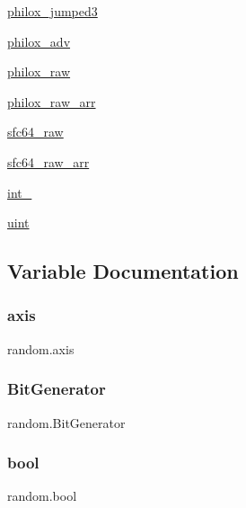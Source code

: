 \begin{DoxyCompactItemize}
\hyperlink{namespacerandom_af1d30e254acbd8179760d565255917eb}{philox\+\_\+jumped3}
\item 
\hyperlink{namespacerandom_a0c56ae1e99cee123038bb26a66bd5a71}{philox\+\_\+adv}
\item 
\hyperlink{namespacerandom_a51e37253ac2b1f47b665ef5a6ac891da}{philox\+\_\+raw}
\item 
\hyperlink{namespacerandom_abdf81d4acfa5d5a4075d9e05ead95583}{philox\+\_\+raw\+\_\+arr}
\item 
\hyperlink{namespacerandom_a3463561156ae5ea78b5dbcb729b95dc6}{sfc64\+\_\+raw}
\item 
\hyperlink{namespacerandom_a464491bb13d16f034a57ffc92edcc025}{sfc64\+\_\+raw\+\_\+arr}
\item 
\hyperlink{namespacerandom_ab5e98a5660edcb11f16c3e69eb96dfd2}{int\+\_\+}
\item 
\hyperlink{namespacerandom_a44f08424a75d8a6cd50e48bd7bd36673}{uint}
\end{DoxyCompactItemize}


\subsection{Variable Documentation}
\mbox{\label{namespacerandom_ae1e4502e48f9644584ce96ec8b8af2ea}} 
\subsubsection{\texorpdfstring{axis}{axis}}
{\footnotesize\ttfamily random.\+axis}

\mbox{\label{namespacerandom_aecaa5197ab2a2624c9c5a4bc67f94573}} 
\subsubsection{\texorpdfstring{Bit\+Generator}{BitGenerator}}
{\footnotesize\ttfamily random.\+Bit\+Generator}

\mbox{\label{namespacerandom_abcd0015f1510b1756ebdbdc12a49a150}} 
\subsubsection{\texorpdfstring{bool}{bool}}
{\footnotesize\ttfamily random.\+bool}

